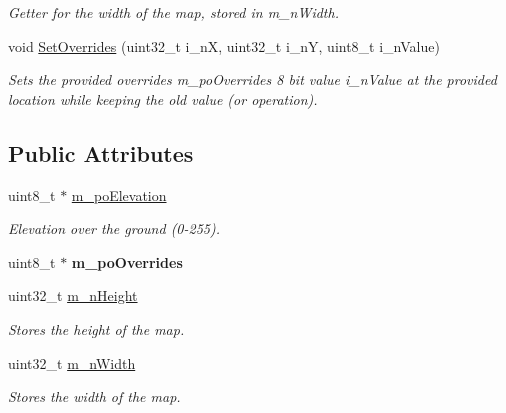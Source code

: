 \begin{DoxyCompactItemize}
\begin{DoxyCompactList}\small\item\em Getter for the width of the map, stored in m\+\_\+n\+Width. \end{DoxyCompactList}\item 
void \mbox{\hyperlink{classplanner_1_1c_map_a1f7f25792e872bc588dfd68a60875514}{Set\+Overrides}} (uint32\+\_\+t i\+\_\+nX, uint32\+\_\+t i\+\_\+nY, uint8\+\_\+t i\+\_\+n\+Value)
\begin{DoxyCompactList}\small\item\em Sets the provided overrides m\+\_\+po\+Overrides 8 bit value i\+\_\+n\+Value at the provided location while keeping the old value (or operation). \end{DoxyCompactList}\end{DoxyCompactItemize}
\subsection*{Public Attributes}
\begin{DoxyCompactItemize}
\item 
\mbox{\label{classplanner_1_1c_map_afcac1cf385cfe2ba5d4171ede861e71e}} 
uint8\+\_\+t $\ast$ \mbox{\hyperlink{classplanner_1_1c_map_afcac1cf385cfe2ba5d4171ede861e71e}{m\+\_\+po\+Elevation}}
\begin{DoxyCompactList}\small\item\em Elevation over the ground (0-\/255). \end{DoxyCompactList}\item 
\mbox{\label{classplanner_1_1c_map_a2adcce11e9133f25662f1bc3ca00948c}} 
uint8\+\_\+t $\ast$ {\bfseries m\+\_\+po\+Overrides}
\item 
\mbox{\label{classplanner_1_1c_map_a73e758f9e164dd5d116b1155ad58b40c}} 
uint32\+\_\+t \mbox{\hyperlink{classplanner_1_1c_map_a73e758f9e164dd5d116b1155ad58b40c}{m\+\_\+n\+Height}}
\begin{DoxyCompactList}\small\item\em Stores the height of the map. \end{DoxyCompactList}\item 
\mbox{\label{classplanner_1_1c_map_a11b636896573c5fc9088d4ebc8984f28}} 
uint32\+\_\+t \mbox{\hyperlink{classplanner_1_1c_map_a11b636896573c5fc9088d4ebc8984f28}{m\+\_\+n\+Width}}
\begin{DoxyCompactList}\small\item\em Stores the width of the map. \end{DoxyCompactList}\end{DoxyCompactItemize}


